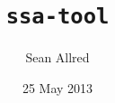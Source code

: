 \documentclass{cs-smp}[2013/12/23]
\title
                         {\texttt{ssa-tool}}%
            [A Utility for the Creation and Evaluation \\
                   of Self-Stabilizing Algorithms]
\author
                            {Sean Allred}%
                           [Alan Jamieson]
\date
                            {25 May 2013}
\begin{document}
\maketitle
\begin{abstract}
  
\end{abstract}
\end{document}
